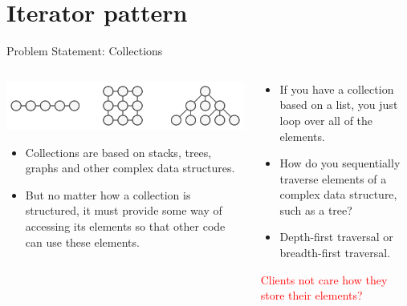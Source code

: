 \documentclass[13pt]{beamer}
\begin{document}
\section{Iterator pattern}

\begin{frame}{Problem Statement: Collections}
	\begin{columns}[T]
		\begin{column}{.5\textwidth}
			\includegraphics[scale=0.4]{./images/problem.png}
			\begin{itemize}
				\item Collections are based on stacks, trees, graphs and other complex data structures.
				\item But no matter how a collection is structured, it must provide some way of accessing its elements so that other code can use these elements. 
			\end{itemize}
		\end{column}
	
		\begin{column}{.5\textwidth}
			\begin{itemize}
				\item If you have a collection based on a list, you just loop over all of the elements.
				\item How do you sequentially traverse elements of a complex data structure, such as a tree?
				\item Depth-first traversal or breadth-first traversal.
			\end{itemize}
			\textcolor{red}{Clients not care how they store their elements?}
		\end{column}
	\end{columns}
\end{frame}
\end{document}
